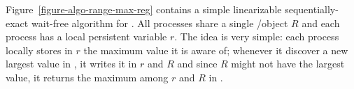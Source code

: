 Figure~\ref{figure-algo-range-max-reg} contains a simple linearizable sequentially-exact wait-free algorithm for \RangeMaxReg.  All processes share a single \R/\W object \(R\) and each process has a local persistent variable \(r\).  The idea is very simple: each process locally stores in \(r\) the maximum value it is aware of; whenever it discover a new largest value in \RMaxW, it writes it in \(r\) and \(R\) and since \(R\) might not have the largest value, it returns the maximum among \(r\) and \(R\) in \RMaxR.


\begin{figure}[!ht]
\end{figure}

